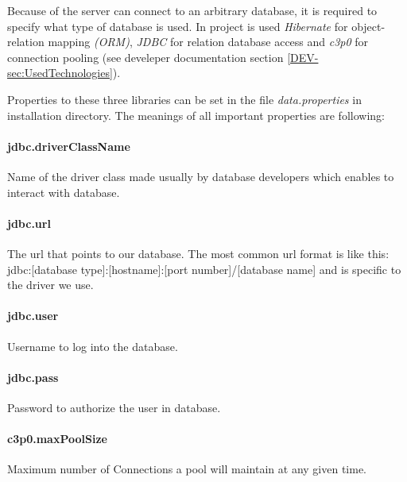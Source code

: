 Because of the server can connect to an arbitrary database, it is required to
specify what type of database is used. In \textan{} project is used \emph{Hibernate}
for object-relation mapping \emph{(ORM)}, \emph{JDBC} for relation database access
and \emph{c3p0} for connection pooling (see develeper documentation section
\ref{DEV-sec:UsedTechnologies}).

Properties to these three libraries can be set in the file \emph{data.properties}
in installation directory. The meanings of all important properties are following:

\paragraph{jdbc.driverClassName}
Name of the driver class made usually by database developers which enables to
interact with database.

\paragraph{jdbc.url}
 The url that points to our database. The most common url format is like this:
jdbc:[database type]:[hostname]:[port number]/[database name]
and is specific to the driver we use.

\paragraph{jdbc.user}
Username to log into the database.
\paragraph{jdbc.pass}
Password to authorize the user in database.


\paragraph{c3p0.maxPoolSize}
Maximum number of Connections a pool will maintain at any given time.


